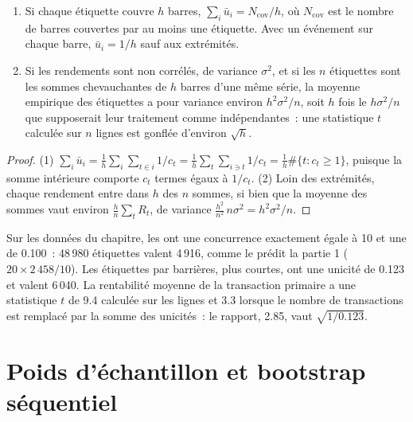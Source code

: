 \begin{proposition}\label{prop:ml:labels:sum}
\begin{enumerate}
\item Si chaque étiquette couvre $h$ barres, $\sum_i\bar u_i = N_{\mathrm{cov}}/h$, où $N_{\mathrm{cov}}$ est le nombre de
barres couvertes par au moins une étiquette. Avec un événement sur chaque barre, $\bar u_i = 1/h$ sauf aux extrémités.
\item Si les rendements sont non corrélés, de variance $\sigma^2$, et si les $n$ étiquettes sont les sommes chevauchantes de $h$ barres d'une même série, la
moyenne empirique des étiquettes a pour variance environ $h^2\sigma^2/n$, soit $h$ fois le $h\sigma^2/n$ que supposerait leur traitement
comme indépendantes~: une statistique $t$ calculée sur $n$ lignes est gonflée d'environ $\sqrt h$.
\end{enumerate}
\end{proposition}

\begin{proof}
(1) $\sum_i\bar u_i = \frac1h\sum_i\sum_{t\in i}1/c_t = \frac1h\sum_t\sum_{i\ni t}1/c_t = \frac1h\#\{t: c_t\ge1\}$,
puisque la somme intérieure comporte $c_t$ termes égaux à $1/c_t$. (2) Loin des extrémités, chaque rendement entre dans $h$ des $n$ sommes, si bien que
la moyenne des sommes vaut environ $\frac hn\sum_tR_t$, de variance $\frac{h^2}{n^2}\,n\sigma^2 = h^2\sigma^2/n$.
\end{proof}

Sur les données du chapitre, les  ont une concurrence exactement égale à 10 et une  de 0.100~:
48\,980 étiquettes valent 4\,916, comme le prédit la partie 1 ($20\times2\,458/10$). Les étiquettes par barrières, plus courtes, ont une unicité
de 0.123 et valent 6\,040. La rentabilité moyenne de la transaction primaire a une statistique $t$ de 9.4 calculée sur les lignes et
3.3 lorsque le nombre de transactions est remplacé par la somme des unicités~: le rapport, 2.85, vaut $\sqrt{1/0.123}$.

\section{Poids d'échantillon et bootstrap séquentiel}

